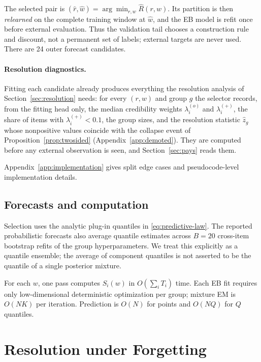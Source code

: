 \documentclass[twoside]{article}
\theoremstyle{definition}
\begin{document}
The selected pair is
$(\hat r,\hat w)=\arg\min_{r,w}\widehat R(r,w)$. Its partition is then
\emph{relearned} on the complete training window at $\hat w$, and the EB
model is refit once before external evaluation. Thus the validation tail
chooses a construction rule and discount, not a permanent set of labels;
external targets are never used. There are 24 outer forecast candidates.

\paragraph{Resolution diagnostics.} Fitting each candidate already
produces everything the resolution analysis of Section~\ref{sec:resolution}
needs: for every $(r,w)$ and group $g$ the selector records, from the fitting
head only, the median credibility weights $\lambda_i^{(o)}$ and
$\lambda_i^{(+)}$, the share of items with $\lambda_i^{(+)}<0.1$, the group
sizes, and the resolution statistic $\hat z_g$ whose nonpositive values
coincide with the collapse event of Proposition~\ref{prop:twosided}
(Appendix~\ref{app:demoted}). They are computed before any external
observation is seen, and Section~\ref{sec:pays} reads them.

Appendix~\ref{app:implementation} gives split edge cases and
pseudocode-level implementation details.


\subsection{Forecasts and computation}\label{sec:complexity}

Selection uses the analytic plug-in quantiles in
\eqref{eq:predictive-law}. The reported probabilistic forecasts also
average quantile estimates across $B=20$ cross-item bootstrap refits of
the group hyperparameters. We treat this explicitly as a quantile
ensemble; the average of component quantiles is not asserted to be the
quantile of a single posterior mixture.

For each $w$, one pass computes $S_i(w)$ in $O(\sum_iT_i)$ time. Each EB
fit requires only low-dimensional deterministic optimization per group;
mixture EM is $O(NK)$ per iteration. Prediction is $O(N)$ for points and
$O(NQ)$ for $Q$ quantiles.

\section{Resolution under Forgetting}\label{sec:theory}
\end{document}
